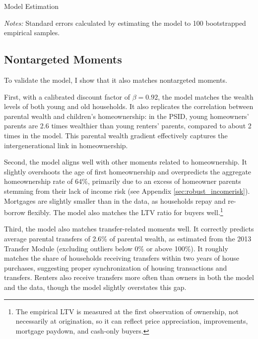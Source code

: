 \documentclass[12pt]{article}
\begin{document}
\begin{table}[tb]
	\center 
	\begin{threeparttable}
	\caption{Model Estimation}\label{tab:esttable}
		
	\end{threeparttable}
	{\begin{footnotesize}\begin{flushleft}\vspace{-0.1in}
		\textit{Notes:} Standard errors calculated by estimating the model to 100 bootstrapped empirical samples.
		\end{flushleft}\end{footnotesize}}
\end{table}
\subsection{Nontargeted Moments}\label{sec:externalval}
To validate the model, I show that it also matches nontargeted moments. 

First, with a calibrated discount factor of $\beta=0.92$, the model matches the wealth levels of both young and old households. It also replicates the correlation between parental wealth and children's homeownership: in the PSID, young homeowners' parents are 2.6 times wealthier than young renters' parents, compared to about 2 times in the model. This parental wealth gradient effectively captures the intergenerational link in homeownership.

Second, the model aligns well with other moments related to homeownership. It slightly overshoots the age of first homeownership and overpredicts the aggregate homeownership rate of 64\%, primarily due to an excess of homeowner parents stemming from their lack of income risk (see Appendix \ref{sec:robust_incomerisk}). Mortgages are slightly smaller than in the data, as households repay and re-borrow flexibly. The model also matches the LTV ratio for buyers well.\footnote{The empirical LTV is measured at the first observation of ownership, not necessarily at origination, so it can reflect price appreciation, improvements, mortgage paydown, and cash-only buyers.}

Third, the model also matches transfer-related moments well. It correctly predicts average parental transfers of 2.6\% of parental wealth, as estimated from the 2013 Transfer Module (excluding outliers below 0\% or above 100\%). It roughly matches the share of households receiving transfers within two years of house purchases, suggesting proper synchronization of housing transactions and transfers. Renters also receive transfers more often than owners in both the model and the data, though the model slightly overstates this gap.
\end{document}
